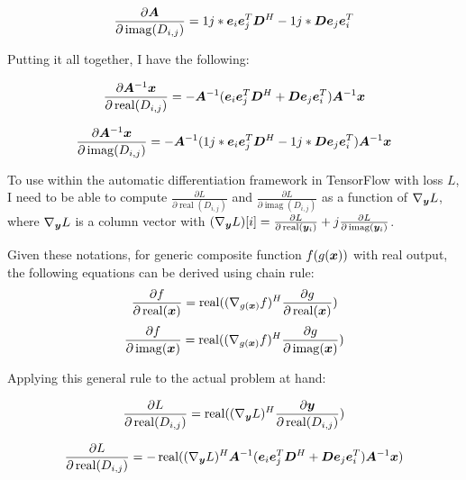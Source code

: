 \documentclass{article}
\begin{document}
\begin{equation}
\frac{\partial \bm{A}}{\partial \operatorname{imag}(D_{i,j})} = 1j*\bm{e}_i\bm{e}_j^T\bm{D}^H - 1j*\bm{D}\bm{e}_j\bm{e}_i^T
\end{equation}

Putting it all together, I have the following:

\begin{equation}
\frac{\partial\bm{A}^{-1}\bm{x}}{\partial \operatorname{real}(D_{i,j})} = -\bm{A}^{-1}(\bm{e}_i\bm{e}_j^T\bm{D}^H + \bm{D}\bm{e}_j\bm{e}_i^T)\bm{A}^{-1}\bm{x}
\end{equation}

\begin{equation}
\frac{\partial\bm{A}^{-1}\bm{x}}{\partial \operatorname{imag}(D_{i,j})} = -\bm{A}^{-1}(1j*\bm{e}_i\bm{e}_j^T\bm{D}^H - 1j*\bm{D}\bm{e}_j\bm{e}_i^T)\bm{A}^{-1}\bm{x}
\end{equation}

To use within the automatic differentiation framework in TensorFlow with loss $L$, I need to be able to compute $\frac{\partial L}{\partial \operatorname{real}(D_{i,j})}$ and $\frac{\partial L}{\partial \operatorname{imag}(D_{i,j})}$ as a function of $\nabla_{\bm{y}} L$, where $\nabla_{\bm{y}} L$ is a column vector with $(\nabla_{\bm{y}} L)[i] = \frac{\partial L}{\partial \operatorname{real}(\bm{y}_i)} + j\frac{\partial L}{\partial \operatorname{imag}(\bm{y}_i)}$.

Given these notations, for generic composite function $f(g(\bm{x}))$ with real output, the following equations can be derived using chain rule:
\begin{equation}
\frac{\partial f}{\partial \operatorname{real}(\bm{x})} = \operatorname{real}((\nabla_{g(\bm{x})} f)^H \frac{\partial g}{\partial \operatorname{real}(\bm{x})})
\end{equation}
\begin{equation}
\frac{\partial f}{\partial \operatorname{imag}(\bm{x})} = \operatorname{real}((\nabla_{g(\bm{x})} f)^H \frac{\partial g}{\partial \operatorname{imag}(\bm{x})})
\end{equation}

Applying this general rule to the actual problem at hand:

\begin{equation}
\frac{\partial L}{\partial \operatorname{real}(D_{i,j})} = \operatorname{real}((\nabla_{\bm{y}} L)^H\frac{\partial \bm{y}}{\partial \operatorname{real}(D_{i,j})})
\end{equation}

\begin{equation}
\frac{\partial L}{\partial \operatorname{real}(D_{i,j})} = -\operatorname{real}((\nabla_{\bm{y}} L)^H\bm{A}^{-1}(\bm{e}_i\bm{e}_j^T\bm{D}^H + \bm{D}\bm{e}_j\bm{e}_i^T)\bm{A}^{-1}\bm{x})
\end{equation}
\end{document}

